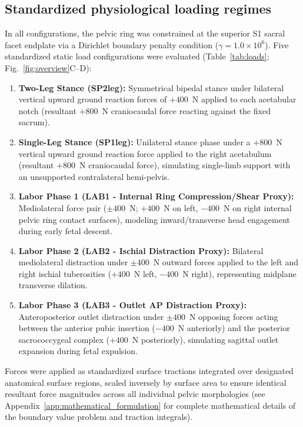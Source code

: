 \subsection{Standardized physiological loading regimes}
In all configurations, the pelvic ring was constrained at the superior S1 sacral facet endplate via a Dirichlet boundary penalty condition ($\gamma = 1.0 \times 10^6$). Five standardized static load configurations were evaluated (Table~\ref{tab:loads}; Fig.~\ref{fig:overview}C--D):
\begin{enumerate}
\item \textbf{Two-Leg Stance (SP2leg):} Symmetrical bipedal stance under bilateral vertical upward ground reaction forces of $+400$~N applied to each acetabular notch (resultant $+800$~N craniocaudal force reacting against the fixed sacrum).
\item \textbf{Single-Leg Stance (SP1leg):} Unilateral stance phase under a $+800$~N vertical upward ground reaction force applied to the right acetabulum (resultant $+800$~N craniocaudal force), simulating single-limb support with an unsupported contralateral hemi-pelvis.
\item \textbf{Labor Phase 1 (LAB1 - Internal Ring Compression/Shear Proxy):} Mediolateral force pair ($\pm 400$~N; $+400$~N on left, $-400$~N on right internal pelvic ring contact surfaces), modeling inward/transverse head engagement during early fetal descent.
\item \textbf{Labor Phase 2 (LAB2 - Ischial Distraction Proxy):} Bilateral mediolateral distraction under $\pm 400$~N outward forces applied to the left and right ischial tuberosities ($+400$~N left, $-400$~N right), representing midplane transverse dilation.
\item \textbf{Labor Phase 3 (LAB3 - Outlet AP Distraction Proxy):} Anteroposterior outlet distraction under $\pm 400$~N opposing forces acting between the anterior pubic insertion ($-400$~N anteriorly) and the posterior sacrococcygeal complex ($+400$~N posteriorly), simulating sagittal outlet expansion during fetal expulsion.
\end{enumerate}
Forces were applied as standardized surface tractions integrated over designated anatomical surface regions, scaled inversely by surface area to ensure identical resultant force magnitudes across all individual pelvic morphologies (see Appendix~\ref{app:mathematical_formulation} for complete mathematical details of the boundary value problem and traction integrals).

\begin{table}[H]
\centering
\caption{Standardized static load cases spanning locomotor and parturition-motivated mechanical regimes.}
\label{tab:loads}
\end{table}

